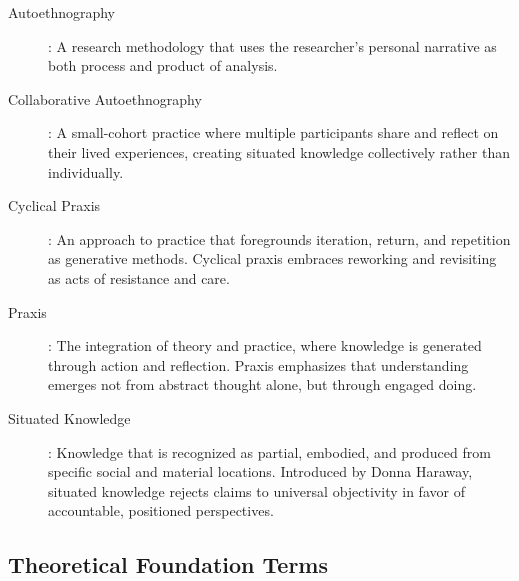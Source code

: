 \begin{description}
	\item[Autoethnography]: A research methodology that uses the researcher's personal narrative as both process and product of analysis.
	
	\item[Collaborative Autoethnography]: A small-cohort practice where multiple participants share and reflect on their lived experiences, creating situated knowledge collectively rather than individually.
	
	\item[Cyclical Praxis]: An approach to practice that foregrounds iteration, return, and repetition as generative methods. Cyclical praxis embraces reworking and revisiting as acts of resistance and care.
	
	\item[Praxis]: The integration of theory and practice, where knowledge is generated through action and reflection. Praxis emphasizes that understanding emerges not from abstract thought alone, but through engaged doing.
	
	\item[Situated Knowledge]: Knowledge that is recognized as partial, embodied, and produced from specific social and material locations. Introduced by Donna Haraway, situated knowledge rejects claims to universal objectivity in favor of accountable, positioned perspectives.
\end{description}

\subsection*{Theoretical Foundation Terms}

